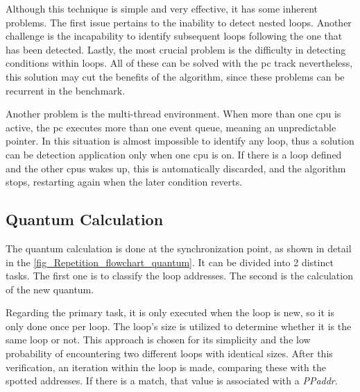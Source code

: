Although this technique is simple and very effective, it has some inherent problems. The first issue pertains to the inability to detect 
nested loops. Another challenge is the incapability to identify subsequent loops following the one that has been detected. Lastly, the most crucial 
problem is the difficulty in detecting conditions within loops. All of these can be solved with the \gls{pc} track nevertheless, this solution 
may cut the benefits of the algorithm, since these problems can be recurrent in the benchmark. 

Another problem is the multi-thread environment. When more than one \gls{cpu} is active, the \gls{pc} executes more than one event queue, 
meaning an unpredictable pointer. In this situation is almost impossible to identify any loop, thus a solution can be detection application   
only when one \gls{cpu} is on. If there is a loop defined and the other \glspl{cpu} wakes up, this is automatically discarded, and the algorithm 
stops, restarting again when the later condition reverts. 

\subsection{Quantum Calculation}

The quantum calculation is done at the synchronization point, as shown in detail in the \autoref{fig_Repetition_flowchart_quantum}. 
It can be divided into 2 distinct tasks. The first one is to classify the loop addresses. The second is the calculation of the new quantum. 

Regarding the primary task, it is only executed when the loop is new, so it is only done once per loop. The loop's size is utilized to 
determine whether it is the same loop or not. This approach is chosen for its simplicity and the low probability of encountering two different 
loops with identical sizes. After this verification, an iteration within the loop is made, comparing these with the spotted addresses. If there 
is a match, that value is associated with a \textit{PPaddr}. 

